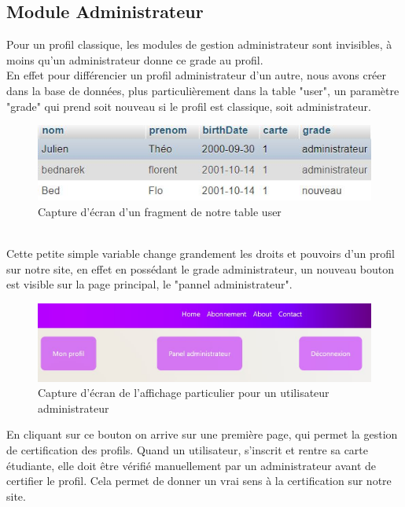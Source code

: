 \documentclass[12pt]{report}
\begin{document}
\subsection{Module Administrateur}
Pour un profil classique, les modules de gestion administrateur sont invisibles, à moins qu'un administrateur donne ce grade au profil.\\
En effet pour différencier un profil administrateur d'un autre, nous avons créer dans la base de données, plus particulièrement dans la table "user", un paramètre "grade" qui prend soit nouveau si le profil est classique, soit administrateur.\\
\begin{figure}[h!]
	\begin{center}
		\includegraphics[scale=1.2]{fragBDD.jpg}
	\end{center}
		\caption{Capture d'écran d'un fragment de notre table user}
\end{figure}\\
Cette petite simple variable change grandement les droits et pouvoirs d'un profil sur notre site, en effet en possédant le grade administrateur, un nouveau bouton est visible sur la page principal, le "pannel administrateur".
\begin{figure}[h!]
	\begin{center}
		\includegraphics[scale=0.8]{boutonpanel.jpg}
	\end{center}
		\caption{Capture d'écran de l'affichage particulier pour un utilisateur administrateur}
\end{figure}
\clearpage
En cliquant sur ce bouton on arrive sur une première page, qui permet la gestion de certification des profils. Quand un utilisateur, s'inscrit et rentre sa carte étudiante, elle doit être vérifié manuellement par un administrateur avant de certifier le profil. Cela permet de donner un vrai sens à la certification sur notre site.\\
\end{document}
